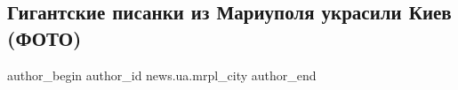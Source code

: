  
 
 
 
 
 
\subsection{Гигантские писанки из Мариуполя украсили Киев (ФОТО)}
\label{sec:10_04_2017.stz.news.ua.mrpl_city.1.gigantskie_pysanki_iz_mariupolja_ukrasili_kiev}
 
\ifcmt
 author_begin
   author_id news.ua.mrpl_city
 author_end
\fi
